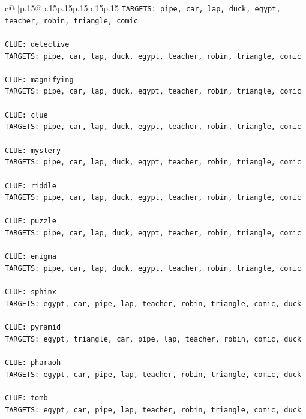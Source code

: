 \documentclass{article}
\begin{document}
{\begin{supertabular}{c@{$\;$}|p{.15\linewidth}@{}p{.15\linewidth}p{.15\linewidth}p{.15\linewidth}p{.15\linewidth}p{.15\linewidth}}
{{{\texttt{TARGETS: pipe, car, lap, duck, egypt, teacher, robin, triangle, comic} \\
\\ 
\texttt{CLUE: detective} \\
\texttt{TARGETS: pipe, car, lap, duck, egypt, teacher, robin, triangle, comic} \\
\\ 
\texttt{CLUE: magnifying} \\
\texttt{TARGETS: pipe, car, lap, duck, egypt, teacher, robin, triangle, comic} \\
\\ 
\texttt{CLUE: clue} \\
\texttt{TARGETS: pipe, car, lap, duck, egypt, teacher, robin, triangle, comic} \\
\\ 
\texttt{CLUE: mystery} \\
\texttt{TARGETS: pipe, car, lap, duck, egypt, teacher, robin, triangle, comic} \\
\\ 
\texttt{CLUE: riddle} \\
\texttt{TARGETS: pipe, car, lap, duck, egypt, teacher, robin, triangle, comic} \\
\\ 
\texttt{CLUE: puzzle} \\
\texttt{TARGETS: pipe, car, lap, duck, egypt, teacher, robin, triangle, comic} \\
\\ 
\texttt{CLUE: enigma} \\
\texttt{TARGETS: pipe, car, lap, duck, egypt, teacher, robin, triangle, comic} \\
\\ 
\texttt{CLUE: sphinx} \\
\texttt{TARGETS: egypt, car, pipe, lap, teacher, robin, triangle, comic, duck} \\
\\ 
\texttt{CLUE: pyramid} \\
\texttt{TARGETS: egypt, triangle, car, pipe, lap, teacher, robin, comic, duck} \\
\\ 
\texttt{CLUE: pharaoh} \\
\texttt{TARGETS: egypt, car, pipe, lap, teacher, robin, triangle, comic, duck} \\
\\ 
\texttt{CLUE: tomb} \\
\texttt{TARGETS: egypt, car, pipe, lap, teacher, robin, triangle, comic, duck} \\
}}}
\end{supertabular}}
\end{document}
